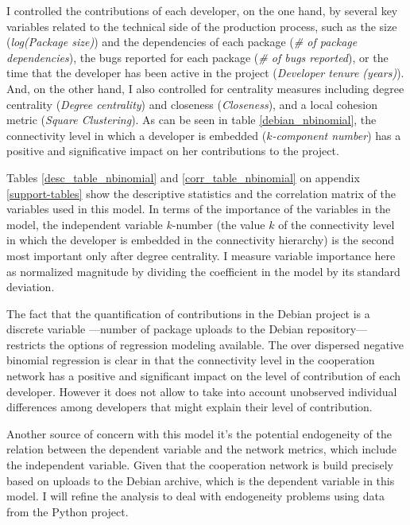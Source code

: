 I controlled the contributions of each developer, on the one hand, by several key variables related to the technical side of the production process, such as the size (\emph{log(Package size)}) and the dependencies of each package (\emph{\# of package dependencies}), the bugs reported for each package (\emph{\# of bugs reported}), or the time that the developer has been active in the project (\emph{Developer tenure (years)}). And, on the other hand, I also controlled for centrality measures including degree centrality (\emph{Degree centrality}) and closeness (\emph{Closeness}), and a local cohesion metric (\emph{Square Clustering}). As can be seen in table \ref{debian_nbinomial}, the connectivity level in which a developer is embedded (\emph{$k$-component number}) has a positive and significative impact on her contributions to the project.



Tables \ref{desc_table_nbinomial} and \ref{corr_table_nbinomial} on appendix \ref{support-tables} show the descriptive statistics and the correlation matrix of the variables used in this model. In terms of the importance of the variables in the model, the independent variable $k$-number (the value $k$ of the connectivity level in which the developer is embedded in the connectivity hierarchy) is the second most important only after degree centrality. I measure variable importance here as normalized magnitude by dividing the coefficient in the model by its standard deviation.
 
The fact that the quantification of contributions in the Debian project is a discrete variable ---number of package uploads to the Debian repository--- restricts the options of regression modeling available. The over dispersed negative binomial regression is clear in that the connectivity level in the cooperation network has a positive and significant impact on the level of contribution of each developer. However it does not allow to take into account unobserved individual differences among developers that might explain their level of contribution.

Another source of concern with this model it's the potential endogeneity of the relation between the dependent variable and the network metrics, which include the independent variable. Given that the cooperation network is build precisely based on uploads to the Debian archive, which is the dependent variable in this model. I will refine the analysis to deal with endogeneity problems using data from the Python project. 

